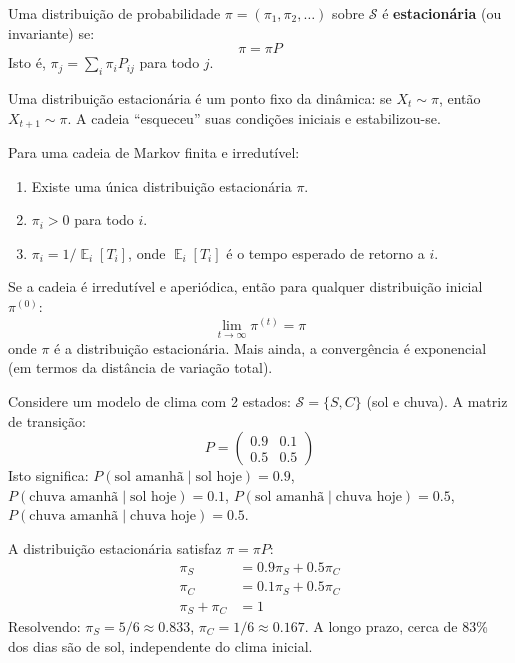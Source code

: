 \documentclass{tufte-handout}
\DeclareMathOperator{\E}{\mathbb{E}}
\begin{document}
\begin{defn}
    Uma distribuição de probabilidade $\pi = (\pi_1, \pi_2, \dots)$ sobre $\mathcal{S}$
    é \textbf{estacionária} (ou invariante) se:
    \[
    \pi = \pi P
    \]
    Isto é, $\pi_j = \sum_i \pi_i P_{ij}$ para todo $j$.
\end{defn}

Uma distribuição estacionária é um ponto fixo da dinâmica: se $X_t \sim \pi$, então
$X_{t+1} \sim \pi$. A cadeia ``esqueceu'' suas condições iniciais e estabilizou-se.

\begin{thm}
    Para uma cadeia de Markov finita e irredutível:
    \begin{enumerate}
        \item Existe uma única distribuição estacionária $\pi$.
        \item $\pi_i > 0$ para todo $i$.
        \item $\pi_i = 1/\E_i[T_i]$, onde $\E_i[T_i]$ é o tempo esperado de retorno a $i$.
    \end{enumerate}
\end{thm}

\begin{thm}
    Se a cadeia é irredutível e aperiódica, então para qualquer distribuição inicial $\pi^{(0)}$:
    \[
    \lim_{t \to \infty} \pi^{(t)} = \pi
    \]
    onde $\pi$ é a distribuição estacionária. Mais ainda, a convergência é exponencial
    (em termos da distância de variação total).
\end{thm}

\begin{exmp}
    Considere um modelo de clima com 2 estados: $\mathcal{S} = \{S, C\}$ (sol e chuva).
    A matriz de transição:
    \[
    P = \begin{pmatrix}
    0.9 & 0.1 \\
    0.5 & 0.5
    \end{pmatrix}
    \]
    Isto significa: $P(\text{sol amanhã} \mid \text{sol hoje}) = 0.9$,
    $P(\text{chuva amanhã} \mid \text{sol hoje}) = 0.1$,
    $P(\text{sol amanhã} \mid \text{chuva hoje}) = 0.5$,
    $P(\text{chuva amanhã} \mid \text{chuva hoje}) = 0.5$.

    A distribuição estacionária satisfaz $\pi = \pi P$:
    \begin{align*}
        \pi_S &= 0.9\pi_S + 0.5\pi_C \\
        \pi_C &= 0.1\pi_S + 0.5\pi_C \\
        \pi_S + \pi_C &= 1
    \end{align*}
    Resolvendo: $\pi_S = 5/6 \approx 0.833$, $\pi_C = 1/6 \approx 0.167$.
    A longo prazo, cerca de 83\% dos dias são de sol, independente do clima inicial.
\end{exmp}
\end{document}
